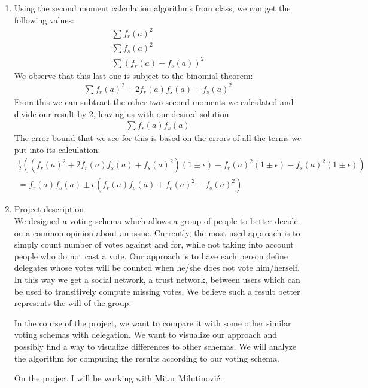 \documentclass[a4paper]{article}
\begin{document}
\begin{enumerate}
\item Using the second moment calculation algorithms from class, we can get the following values:
	\begin{align}
		\sum{f_r(a)^2} \\	
		\sum{f_s(a)^2} \\
		\sum{(f_r(a)+f_s(a))^2}	
	\end{align}
	We observe that this last one is subject to the binomial theorem:
	\begin{align}
		\sum{f_r(a)^2 + 2f_r(a)f_s(a) + f_s(a)^2}
	\end{align}
	From this we can subtract the other two second moments we calculated and divide our result by 2, leaving us with our desired solution
	\begin{align}
		\sum{f_r(a)f_s(a)}
	\end{align}
	The error bound that we see for this is based on the errors of all the terms we put into its calculation:
	\begin{align}
		\frac{1}{2}((f_r(a)^2 + 2f_r(a)f_s(a) + f_s(a)^2)(1 \pm \epsilon) - f_r(a)^2(1 \pm \epsilon) - f_s(a)^2(1 \pm \epsilon)) \\
		= f_r(a)f_s(a) \pm \epsilon( f_r(a)f_s(a) + f_r(a)^2 + f_s(a)^2 )
	\end{align}
\item Project description \\
	We designed a voting schema which allows a group of people to better decide on a common opinion about an issue. Currently,
the most used approach is to simply count number of votes against and for, while not taking into account people who do
not cast a vote. Our approach is to have each person define delegates whose votes will be counted when he/she does not
vote him/herself. In this way we get a social network, a trust network, between users which can be
used to transitively compute missing votes. We believe such a result better represents the will of the group.

In the course of the project, we want to compare it with some other similar voting schemas with delegation. We want to visualize
our approach and possibly find a way to visualize differences to other schemas. We will analyze the algorithm for computing the
results according to our voting schema.

On the project I will be working with Mitar Milutinovi\'c.
\end{enumerate}
\end{document}
